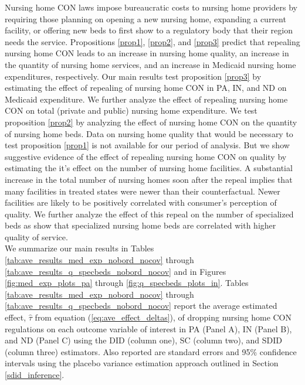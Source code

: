 \documentclass[../Main.tex]{subfiles}
\begin{document}
Nursing home CON laws impose bureaucratic costs to nursing home providers by requiring those planning on opening a new nursing home, expanding a current facility, or offering new beds to first show to a regulatory body that their region needs the service. Propositions \ref{prop1}, \ref{prop2}, and \ref{prop3} predict that repealing nursing home CON leads to an increase in nursing home quality, an increase in the quantity of nursing home services, and an increase in Medicaid nursing home expenditures, respectively. Our main results test proposition \ref{prop3} by estimating the effect of repealing of nursing home CON in PA, IN, and ND on Medicaid expenditure. We further analyze the effect of repealing nursing home CON on total (private and public) nursing home expenditure. We test proposition \ref{prop2} by analyzing the effect of nursing home CON on the quantity of nursing home beds. Data on nursing home quality that would be necessary to test proposition \ref{prop1} is not available for our period of analysis. But we show suggestive evidence of the effect of repealing nursing home CON on quality by estimating the it's effect on the number of nursing home facilities. A substantial increase in the total number of nursing homes soon after the repeal implies that many facilities in treated states were newer than their counterfactual. Newer facilities are likely to be positively correlated with consumer's perception of quality. We further analyze the effect of this repeal on the number of specialized beds as \citet{grabowski2010quality} show that specialized nursing home beds are correlated with higher quality of service.\\
\indent We summarize our main results in Tables \ref{tab:ave_results_med_exp_nobord_nocov} through \ref{tab:ave_results_q_specbeds_nobord_nocov} and in Figures \ref{fig:med_exp_plots_pa} through \ref{fig:q_specbeds_plots_in}. Tables \ref{tab:ave_results_med_exp_nobord_nocov} through \ref{tab:ave_results_q_specbeds_nobord_nocov} report the average estimated effect, $\hat{\tau}$ from equation (\ref{eq:ave_effect_deltas}), of dropping nursing home CON regulations on each outcome variable of interest in PA (Panel A), IN (Panel B), and ND (Panel C) using the DID (column one), SC (column two), and SDID (column three) estimators. Also reported are standard errors and 95\% confidence intervals using the placebo variance estimation approach outlined in Section \ref{sdid_inference}.\\
\end{document}
